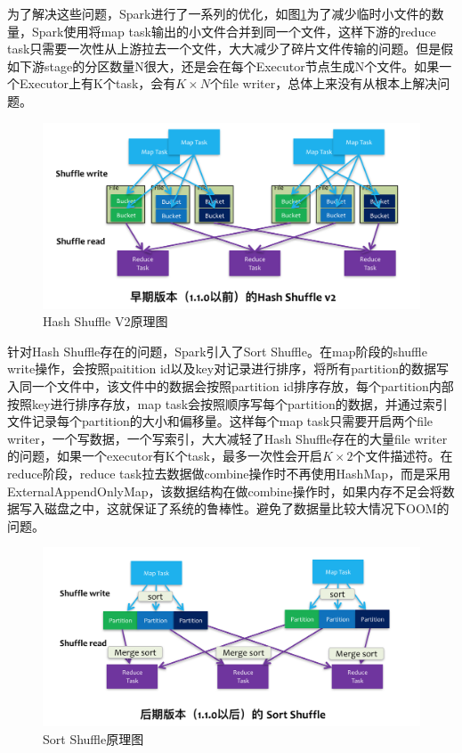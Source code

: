 为了解决这些问题，Spark进行了一系列的优化，如图\ref{fig:shuffle-v2}为了减少临时小文件的数量，Spark使用将map task输出的小文件合并到同一个文件，这样下游的reduce task只需要一次性从上游拉去一个文件，大大减少了碎片文件传输的问题。但是假如下游stage的分区数量N很大，还是会在每个Executor节点生成N个文件。如果一个Executor上有K个task，会有$K \times N$个file writer，总体上来没有从根本上解决问题。


\begin{figure}
    \centering
    \includegraphics[width=1\textwidth]{Img/spark-shuffle-v2.png}
    \caption{Hash Shuffle V2原理图}
    \label{fig:shuffle-v2}
\end{figure}


针对Hash Shuffle存在的问题，Spark引入了Sort Shuffle。在map阶段的shuffle write操作，会按照paitition id以及key对记录进行排序，将所有partition的数据写入同一个文件中，该文件中的数据会按照partition id排序存放，每个partition内部按照key进行排序存放，map task会按照顺序写每个partition的数据，并通过索引文件记录每个partition的大小和偏移量。这样每个map task只需要开启两个file writer，一个写数据，一个写索引，大大减轻了Hash Shuffle存在的大量file writer的问题，如果一个executor有K个task，最多一次性会开启$K \times 2$个文件描述符。在reduce阶段，reduce task拉去数据做combine操作时不再使用HashMap，而是采用ExternalAppendOnlyMap，该数据结构在做combine操作时，如果内存不足会将数据写入磁盘之中，这就保证了系统的鲁棒性。避免了数据量比较大情况下OOM的问题。


\begin{figure}
    \centering
    \includegraphics[width=1\textwidth]{Img/sort-shuffle.png}
    \caption{Sort Shuffle原理图}
    \label{fig:sort-shuffle}
\end{figure}



